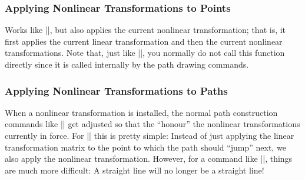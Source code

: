 \begin{command}{\pgftransformnonlinear{}}
\begin{codeexample}[preamble={\usepgfmodule{nonlineartransformations}}]
\end{codeexample}
\end{command}


\subsubsection{Applying Nonlinear Transformations to Points}

\begin{command}{\pgfpointtransformednonlinear{}}
    Works like |\pgfpointtransformed|, but also applies the current nonlinear
    transformation; that is, it first applies the current linear transformation
    and then the current nonlinear transformations. Note that, just like
    |\pgfpointtransformed|, you normally do not call this function directly
    since it is called internally by the path drawing commands.
\end{command}


\subsubsection{Applying Nonlinear Transformations to Paths}

When a nonlinear transformation is installed, the normal path construction
commands like |\pgfpathmoveto| get adjusted so that the ``honour'' the
nonlinear transformations currently in force. For |\pgfpathmoveto| this is
pretty simple: Instead of just applying the linear transformation matrix to the
point to which the path should ``jump'' next, we also apply the nonlinear
transformation. However, for a command like |\pgfpathlineto|, things are much
more difficult: A straight line will no longer be a straight line!

